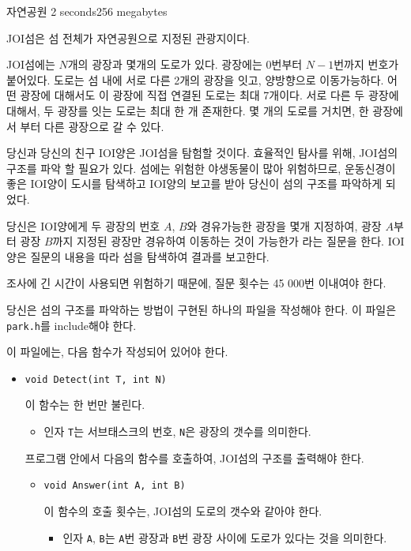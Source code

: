 \begin{problem}{자연공원}
	{}{}
	{2 seconds}{256 megabytes}{}
	
	JOI섬은 섬 전체가 자연공원으로 지정된 관광지이다.
	
	JOI섬에는 $N$개의 광장과 몇개의 도로가 있다. 광장에는 0번부터 $N-1$번까지 번호가 붙어있다. 도로는 섬 내에 서로 다른 2개의 광장을 잇고, 양방향으로 이동가능하다. 어떤 광장에 대해서도 이 광장에 직접 연결된 도로는 최대 7개이다. 서로 다른 두 광장에 대해서, 두 광장를 잇는 도로는 최대 한 개 존재한다. 몇 개의 도로를 거치면, 한 광장에서 부터 다른 광장으로 갈 수 있다.
	
	당신과 당신의 친구 IOI양은 JOI섬을 탐험할 것이다. 효율적인 탐사를 위해, JOI섬의 구조를 파악 할 필요가 있다. 섬에는 위험한 야생동물이 많아 위험하므로, 운동신경이 좋은 IOI양이 도시를 탐색하고 IOI양의 보고를 받아 당신이 섬의 구조를 파악하게 되었다.
	
	당신은 IOI양에게 두 광장의 번호 $A$, $B$와 경유가능한 광장을 몇개 지정하여, 광장 $A$부터 광장 $B$까지 지정된 광장만 경유하여 이동하는 것이 가능한가 라는 질문을 한다. IOI양은 질문의 내용을 따라 섬을 탐색하여 결과를 보고한다.
	
	조사에 긴 시간이 사용되면 위험하기 때문에, 질문 횟수는 45 000번 이내여야 한다.
	
	\Specification
	
	당신은 섬의 구조를 파악하는 방법이 구현된 하나의 파일을 작성해야 한다. 이 파일은 \texttt{park.h}를 include해야 한다.
	
	이 파일에는, 다음 함수가 작성되어 있어야 한다.
	
	\begin{itemize}
		\item \texttt{void Detect(int T, int N)}
		
		이 함수는 한 번만 불린다.
		\begin{itemize}
			\item 인자 \texttt{T}는 서브태스크의 번호, \texttt{N}은 광장의 갯수를 의미한다.
		\end{itemize}
		
		프로그램 안에서 다음의 함수를 호출하여, JOI섬의 구조를 출력해야 한다.
		\begin{itemize}
			\item \texttt{void Answer(int A, int B)}
			
			이 함수의 호출 횟수는, JOI섬의 도로의 갯수와 같아야 한다.
			
			\begin{itemize}
				\item 인자 \texttt{A}, \texttt{B}는 \texttt{A}번 광장과 \texttt{B}번 광장 사이에 도로가 있다는 것을 의미한다.
			\end{itemize}
		

\end{itemize}
\end{itemize}
\end{problem}
